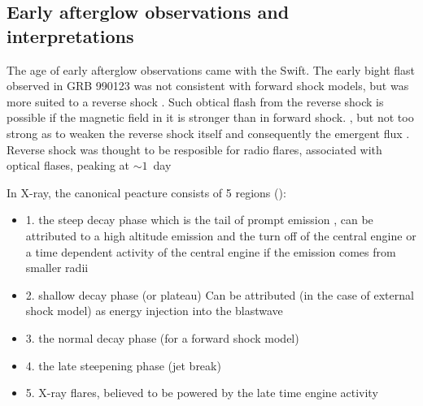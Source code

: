 
\subsection{Early afterglow observations and interpretations}

The age of early afterglow observations came with the Swift. 
The early bight flast observed in GRB 990123 was not consistent with forward shock models, but was more suited to a reverse shock \cite{Meszaros and Rees, 1997a; Meszaros and Rees, 1999; Sari and Piran, 1999a,b}. Such obtical flash from the reverse shock is possible if the magnetic field in it is stronger than in forward shock. \cite{Fan et al., 2002; Zhang et al., 2003a; Kumar and Panaitescu, 2003}, but not too strong as to weaken the reverse shock itself and consequently the emergent flux \cite{e.g. Zhang and Kobayashi, 2005; Mimica et al., 2009; Narayan et al., 2011}. 
Reverse shock was thought to be resposible for radio flares, associated with optical flases, peaking at $\sim 1$~day \cite{e.g. Sari and Piran, 1999a; Kobayashi and Zhang, 2003b)}

In X-ray, the canonical peacture consists of 5 regions (\cite{Zhang et al., 2006; Nousek et al., 2006,}):
\begin{itemize}
    \item 1. the steep decay phase which is the tail of prompt emission \cite{Barthelmy et al., 2005b}, can be attributed to a high altitude emission and the turn off of the central engine \cite{Kumar and Panaitescu, 2000a; Dermer, 2004; Zhang et al., 2006; Nousek et al., 2006; Liang et al., 2006a} or a time dependent activity of the central engine if the emission comes from smaller radii \cite{Fan and Wei, 2005; Barniol Baruran and Kumar, 2009}
    \item 2. shallow decay phase (or plateau) Can be attributed (in the case of external shock model) as energy injection into the blastwave \cite{Zhang et al., 2006; Nousek et al., 2006; Panaitescu et al., 2006b}
    \item 3. the normal decay phase (for a forward shock model)
    \item 4. the late steepening phase (jet break)
    \item 5. X-ray flares, believed to be powered by the late time engine activity 
    \cite{Ioka et al., 2005; Burrows et al., 2005b; Fan andWei, 2005; Zhang et al., 2006; Liang et al., 2006a; Lazzati and Perna, 2007; Chincarini et al., 2007; Maxham and Zhang, 2009; Margutti et al., 2010}
\end{itemize}


